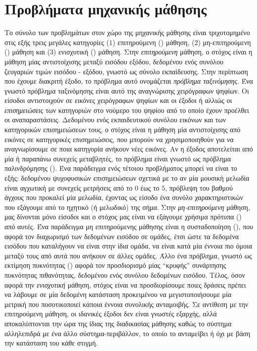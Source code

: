 \section{Προβλήματα μηχανικής μάθησης}
Το σύνολο των προβλημάτων στον χώρο της μηχανικής μάθησης είναι τριχοτομημένο στις εξής τρεις μεγάλες κατηγορίες ($1$) επιτηρούμενη () μάθηση, ($2$) μη-επιτηρούμενη () μάθηση και ($3$) ενισχυτική () μάθηση. 
Στην \textit{επιτηρούμενη} μάθηση, ο στόχος είναι η μάθηση μίας αντιστοίχισης μεταξύ εισόδου εξόδου, δεδομένου ενός συνόλου ζευγαριών τιμών εισόδου - εξόδου, γνωστό ως σύνολο εκπαίδευσης.
Στην περίπτωση που έχουμε διακριτή έξοδο, το πρόβλημα αυτό ονομάζεται \textit{πρόβλημα ταξινόμησης}.
Ένα γνωστό πρόβλημα ταξινόμησης είναι αυτό της αναγνώρισης χειρόγραφων ψηφίων.
Οι είσοδοι αντιστοιχούν σε εικόνες χειρόγραφων ψηφίων και οι έξοδοι ή αλλιώς οι \textit{επισημειώσεις} των κατηγοριών στο νούμερο του ψηφίου από το οποίο έχουν προέλθει οι αναπαραστάσεις.
Δεδομένου ενός εκπαιδευτικού συνόλου εικόνων και των κατηγορικών επισημειώσεων τους, ο στόχος είναι η μάθηση μία αντιστοίχισης από εικόνες σε κατηγορικές επισημειώσεις, που μπορούν να χρησιμοποιηθούν για να αναγνωρίσουμε σε ποια κατηγορία ανήκουν νέες εικόνες.
Αν η έξοδος αποτελείται από μία ή παραπάνω συνεχείς μεταβλητές, το πρόβλημα είναι γνωστό ως πρόβλημα παλινδρόμησης ().
Ένα παράδειγμα ενός τέτοιου προβλήματος μπορεί να είναι το εξής: δεδομένου ψυχοφυσικών επισημειώσεων σχετικά με το αν μία μουσική μελωδία είναι αγχωτική με συνεχείς μετρήσεις από το $0$ έως το $5$, πρόβλεψη του βαθμού άγχους που προκαλεί μία μελωδία, έχοντας ως είσοδο ένα συνόλο χαρακτηριστικών που εξάγουμε από το ηχητικό (ή μελωδικό) της σήμα.
Στην \textit{μη-επιτηρούμενη} μάθηση, μας δίνονται μόνο είσοδοι και ο στόχος μας είναι να εξάγουμε χρήσιμα πρότυπα () από αυτές.
Ένα παράδειγμα μη επιτηρούμενης μάθησης είναι η συσταδοποίηση (), που αφορά τον διαχωρισμό των δεδομένων εισόδου σε ομάδες, έτσι ώστε τα δεδομένα εισόδου που καταλήγουν να είναι στην ίδια ομάδα, να είναι κατά μία έννοια πιο όμοια μεταξύ τους από αυτά που ανήκουν σε άλλες ομάδες.
Άλλο ένα πρόβλημα, γνωστό ως εκτίμηση πυκνότητας () αφορά τον προσδιορισμό μίας ``κρυφής'' συνάρτησης πυκνότητας πιθανότητας, δεδομένου ενός συνόλου δεδομένων εισόδου.
Τέλος, όσον αφορά την \textit{ενισχυτική} μάθηση, στόχος είναι να προσδιορίσουμε ποιες δράσεις πρέπει να λάβουμε σε μία δεδομένη κατάσταση προκειμένου να μεγιστοποιήσουμε μία μετρική που ποσοτικοποιεί κάποια έννοια συνολικής ανταμοιβής.
Σε αντίθεση με την επιτηρούμενη μάθηση, οι ιδανικές έξοδοι δεν είναι γνωστές εξαρχής, αλλά αποκαλύπτονται την ώρα της ίδιας της διαδικασίας μάθησης καθώς το σύστημα αλληλεπιδρά με ένα άλλο σύστημα-περιβάλλον, το οποίο το ανταμείβει ή όχι με βάση την κατάσταση του κάθε στιγμή.
